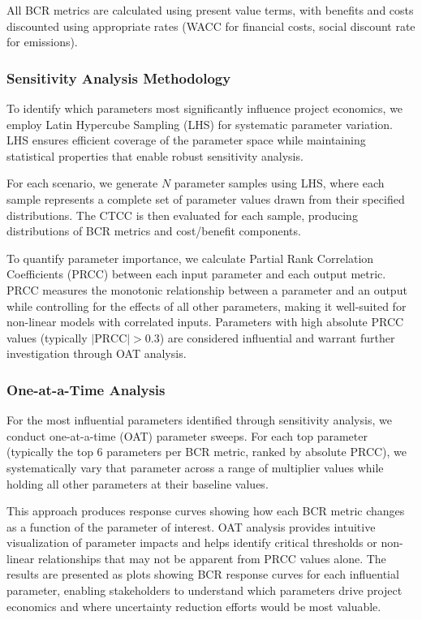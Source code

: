 \documentclass[11pt,twocolumn,a4paper]{article}
\begin{document}
All BCR metrics are calculated using present value terms, with benefits and costs discounted using appropriate rates (WACC for financial costs, social discount rate for emissions).

\subsubsection{Sensitivity Analysis Methodology}

To identify which parameters most significantly influence project economics, we employ Latin Hypercube Sampling (LHS) for systematic parameter variation. LHS ensures efficient coverage of the parameter space while maintaining statistical properties that enable robust sensitivity analysis.

For each scenario, we generate $N$ parameter samples using LHS, where each sample represents a complete set of parameter values drawn from their specified distributions. The CTCC is then evaluated for each sample, producing distributions of BCR metrics and cost/benefit components.

To quantify parameter importance, we calculate Partial Rank Correlation Coefficients (PRCC) between each input parameter and each output metric. PRCC measures the monotonic relationship between a parameter and an output while controlling for the effects of all other parameters, making it well-suited for non-linear models with correlated inputs. Parameters with high absolute PRCC values (typically $|\text{PRCC}| > 0.3$) are considered influential and warrant further investigation through OAT analysis.

\subsubsection{One-at-a-Time Analysis}

For the most influential parameters identified through sensitivity analysis, we conduct one-at-a-time (OAT) parameter sweeps. For each top parameter (typically the top 6 parameters per BCR metric, ranked by absolute PRCC), we systematically vary that parameter across a range of multiplier values while holding all other parameters at their baseline values.

This approach produces response curves showing how each BCR metric changes as a function of the parameter of interest. OAT analysis provides intuitive visualization of parameter impacts and helps identify critical thresholds or non-linear relationships that may not be apparent from PRCC values alone. The results are presented as plots showing BCR response curves for each influential parameter, enabling stakeholders to understand which parameters drive project economics and where uncertainty reduction efforts would be most valuable.
\end{document}

